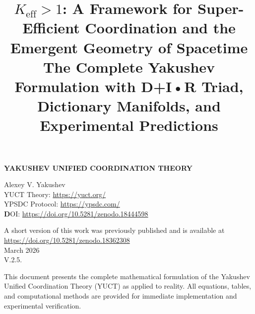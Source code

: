 \documentclass[11pt,a4paper]{article}
\title{$K_{\mathrm{eff}} > 1$: A Framework for Super-Efficient Coordination and the Emergent Geometry of Spacetime \\ 
	\large The Complete Yakushev Formulation with D+I•R Triad, Dictionary Manifolds, and Experimental Predictions}
\begin{document}
\begin{titlepage}
	\begin{center}
		\vspace*{3cm}
		\Huge\textbf{YAKUSHEV UNIFIED COORDINATION THEORY\\
		}
		
		
		
		\vspace{2cm}
		\Large
		Alexey V. Yakushev\\
		\vspace{2cm}
	YUCT Theory: \url{https://yuct.org/}\\
YPSDC Protocol: \url{https://ypsdc.com/}\\


\vspace{2cm}
\textbf DOI: \url{https://doi.org/10.5281/zenodo.18444598}\\

\vspace{1cm}

\vspace{0cm}
\large 
A short version of this work was previously published and is available at\\ \url{https://doi.org/10.5281/zenodo.18362308}\\
\vspace{1cm}
March 2026 \\ \large V.2.5.
		
		\vfill
		\normalsize
		This document presents the complete mathematical formulation of the Yakushev Unified Coordination Theory (YUCT) as applied to reality. All equations, tables, and computational methods are provided for immediate implementation and experimental verification.
	\end{center}
\end{titlepage}

	
	
	\maketitle
	
\end{document}
